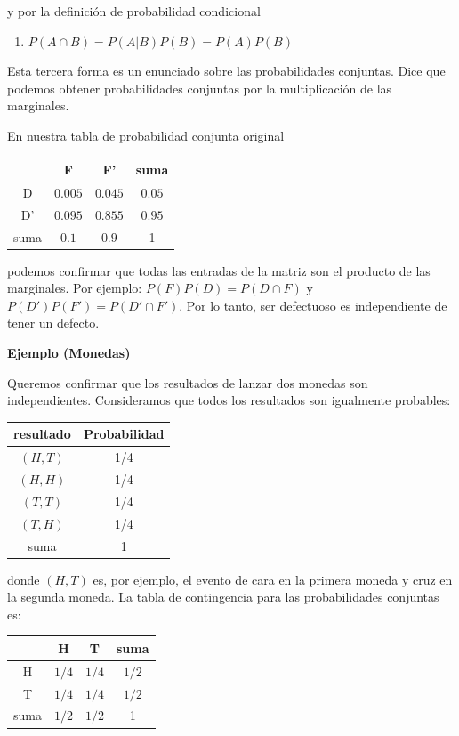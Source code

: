 \documentclass[
]{book}
\providecommand{\tightlist}{%
  \setlength{\itemsep}{0pt}\setlength{\parskip}{0pt}}
\begin{document}
y por la definición de probabilidad condicional

\begin{enumerate}
\def\labelenumi{\arabic{enumi})}
\setcounter{enumi}{2}
\tightlist
\item
  \(P(A\cap B)=P(A|B)P(B)=P(A)P(B)\)
\end{enumerate}

Esta tercera forma es un enunciado sobre las probabilidades conjuntas. Dice que podemos obtener probabilidades conjuntas por la multiplicación de las marginales.

En nuestra tabla de probabilidad conjunta original

\begin{longtable}[]{@{}cccc@{}}
\toprule\noalign{}
& F & F' & suma \\
\midrule\noalign{}
\endhead
\bottomrule\noalign{}
\endlastfoot
D & \(0.005\) & \(0.045\) & \(0.05\) \\
D' & \(0.095\) & \(0.855\) & \(0.95\) \\
suma & \(0.1\) & \(0.9\) & 1 \\
\end{longtable}

podemos confirmar que todas las entradas de la matriz son el producto de las marginales. Por ejemplo: \(P(F)P(D)= P(D \cap F)\) y \(P(D')P(F')=P(D' \cap F')\). Por lo tanto, ser defectuoso es independiente de tener un defecto.

\textbf{Ejemplo (Monedas)}

Queremos confirmar que los resultados de lanzar dos monedas son independientes. Consideramos que todos los resultados son igualmente probables:

\begin{longtable}[]{@{}cc@{}}
\toprule\noalign{}
resultado & Probabilidad \\
\midrule\noalign{}
\endhead
\bottomrule\noalign{}
\endlastfoot
\((H,T)\) & 1/4 \\
\((H,H)\) & 1/4 \\
\((T,T)\) & 1/4 \\
\((T,H)\) & 1/4 \\
suma & 1 \\
\end{longtable}

donde \((H,T)\) es, por ejemplo, el evento de cara en la primera moneda y cruz en la segunda moneda. La tabla de contingencia para las probabilidades conjuntas es:

\begin{longtable}[]{@{}cccc@{}}
\toprule\noalign{}
& H & T & suma \\
\midrule\noalign{}
\endhead
\bottomrule\noalign{}
\endlastfoot
H & \(1/4\) & \(1/4\) & \(1/2\) \\
T & \(1/4\) & \(1/4\) & \(1/2\) \\
suma & \(1/2\) & \(1/2\) & 1 \\
\end{longtable}
\end{document}
